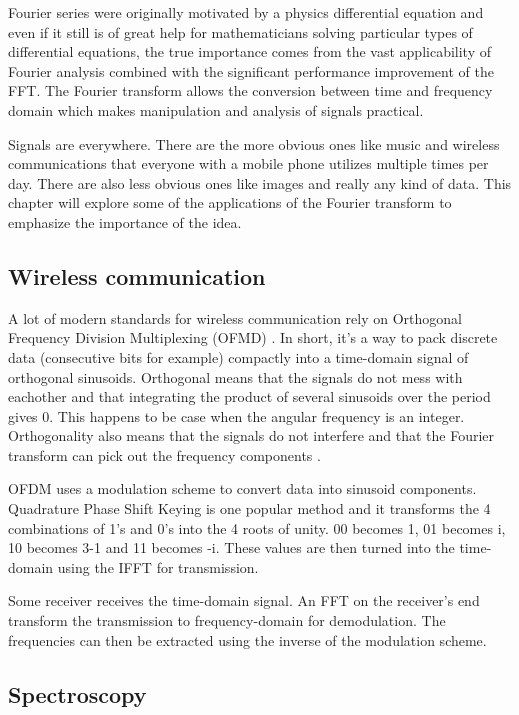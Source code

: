 Fourier series were originally motivated by a physics differential equation and even if it still is of great help for mathematicians solving particular types of differential equations, the true importance comes from the vast applicability of Fourier analysis combined with the significant performance improvement of the FFT. The Fourier transform allows the conversion between time and frequency domain which makes manipulation and analysis of signals practical. 

Signals are everywhere. There are the more obvious ones like music and wireless communications that everyone with a mobile phone utilizes multiple times per day. There are also less obvious ones like images and really any kind of data. This chapter will explore some of the applications of the Fourier transform to emphasize the importance of the idea.

\subsection{Wireless communication}
A lot of modern standards for wireless communication rely on Orthogonal Frequency Division Multiplexing (OFMD) . In short, it's a way to pack discrete data (consecutive bits for example) compactly into a time-domain signal of orthogonal sinusoids. Orthogonal means that the signals do not mess with eachother and that integrating the product of several sinusoids over the period gives 0. This happens to be case when the angular frequency is an integer. Orthogonality also means that the signals do not interfere and that the Fourier transform can pick out the frequency components . 

OFDM uses a modulation scheme to convert data into sinusoid components. Quadrature Phase Shift Keying is one popular method and it transforms the 4 combinations of 1's and 0's into the 4 roots of unity. 00 becomes 1, 01 becomes i, 10 becomes 3-1 and 11 becomes -i. These values are then turned into the time-domain using the IFFT for transmission. 

Some receiver receives the time-domain signal. An FFT on the receiver's end transform the transmission to frequency-domain for demodulation. The frequencies can then be extracted using the inverse of the modulation scheme. 

\subsection{Spectroscopy}

